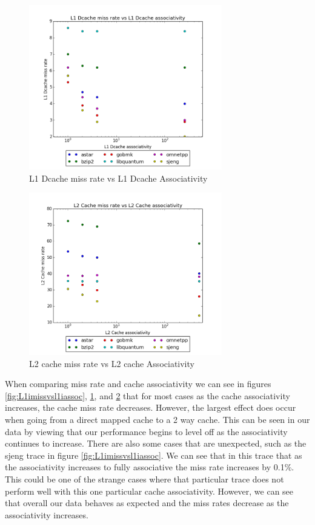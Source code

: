 \documentclass{article}
\begin{document}
\begin{figure}[ht]
    \centering
    \includegraphics[width=0.75\textwidth]{plots/L1Dcache_miss_vs_associativity.png}
    \caption{L1 Dcache miss rate vs L1 Dcache Associativity}
    \label{fig:l1missvsl1assoc}
\end{figure}

\begin{figure}[ht]
    \centering
    \includegraphics[width=0.75\textwidth]{plots/L2cache_miss_vs_L2cache_associativity.png}
    \caption{L2 cache miss rate vs L2 cache Associativity}
    \label{fig:l2missvsl2assoc}
\end{figure}

When comparing miss rate and cache associativity we can see in figures \ref{fig:L1imissvsl1iassoc}, \ref{fig:l1missvsl1assoc}, and \ref{fig:l2missvsl2assoc} that for most cases as the cache associativity increases, the cache miss rate decreases. However, the largest effect does occur when going from a direct mapped cache to a 2 way cache. This can be seen in our data by viewing that our performance begins to level off as the associativity continues to increase. There are also some cases that are unexpected, such as the sjeng trace in figure \ref{fig:L1imissvsl1iassoc}. We can see that in this trace that as the associativity increases to fully associative the miss rate increases by 0.1\%. This could be one of the strange cases where that particular trace does not perform well with this one particular cache associativity. However, we can see that overall our data behaves as expected and the miss rates decrease as the associativity increases. 
\end{document}
